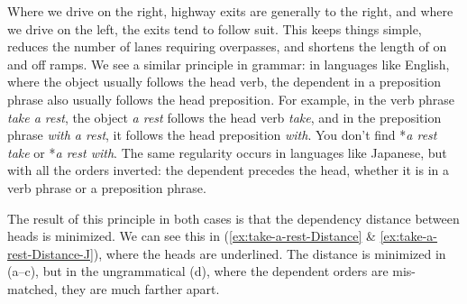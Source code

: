 
Where we drive on the right, highway exits are generally to the right, and where we drive on the left, the exits tend to follow suit. This keeps things simple, reduces the number of lanes requiring overpasses, and shortens the length of on and off ramps. We see a similar principle in grammar: in languages like English, where the object usually follows the head verb, the dependent in a preposition phrase also usually follows the head preposition. For example, in the verb phrase \textit{take a rest}, the object \textit{a rest} follows the head verb \textit{take}, and in the preposition phrase \textit{with a rest}, it follows the head preposition \textit{with}. You don't find *\textit{a rest take} or *\textit{a rest with}. The same regularity occurs in languages like Japanese, but with all the orders inverted: the dependent precedes the head, whether it is in a verb phrase or a preposition phrase.

The result of this principle in both cases is that the dependency distance between heads is minimized. We can see this in (\ref{ex:take-a-rest-Distance} \& \ref{ex:take-a-rest-Distance-J}), where the heads are underlined. The distance is minimized in (a--c), but in the ungrammatical (d), where the dependent orders are mis-matched, they are much farther apart.

\ea \label{ex:take-a-rest-Distance}
    \z
\z

\ea \label{ex:take-a-rest-Distance-J}
    \z
\z

